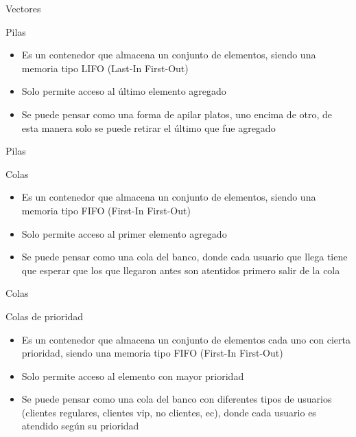 \documentclass[]{beamer}
\begin{document}
\begin{frame}{Vectores}
  
\end{frame}

\begin{frame}{Pilas}
  \begin{itemize}
    \item Es un contenedor que almacena un conjunto de elementos, siendo una memoria tipo LIFO (Last-In First-Out)
      \pause
    \item Solo permite acceso al \'ultimo elemento agregado
      \pause
    \item Se puede pensar como una forma de apilar platos, uno encima de otro, de esta manera solo se puede retirar el \'ultimo que fue agregado
  \end{itemize}
\end{frame}

\begin{frame}{Pilas}
  
\end{frame}

\begin{frame}{Colas}
  \begin{itemize}
    \item Es un contenedor que almacena un conjunto de elementos, siendo una memoria tipo FIFO (First-In First-Out)
      \pause
    \item Solo permite acceso al primer elemento agregado
      \pause
    \item Se puede pensar como una cola del banco, donde cada usuario que llega tiene que esperar que los que llegaron antes son atentidos primero salir de la cola
  \end{itemize}
\end{frame}

\begin{frame}{Colas}
  
\end{frame}

\begin{frame}{Colas de prioridad}
  \begin{itemize}
    \item Es un contenedor que almacena un conjunto de elementos cada uno con cierta prioridad, siendo una memoria tipo FIFO (First-In First-Out)
      \pause
    \item Solo permite acceso al elemento con mayor prioridad
      \pause
    \item Se puede pensar como una cola del banco con diferentes tipos de usuarios (clientes regulares, clientes vip, no clientes, ec), donde cada usuario es atendido seg\'un su prioridad
  \end{itemize}
\end{frame}
\end{document}
